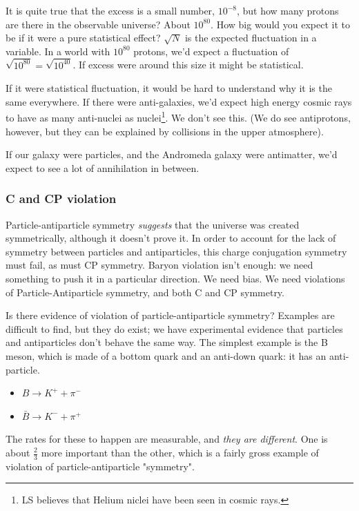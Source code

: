\documentclass[]{article}
\begin{document}
 It is quite true that the excess is a small number, $10^{-8}$, but how many protons are there in the observable universe? About $10^{80}$. How big would you expect it to be if it were a pure statistical effect? $\sqrt{N}$ is the expected fluctuation in a variable. In a world with $10^{80}$ protons, we'd expect a fluctuation of $\sqrt{10^{80}}=\sqrt{10^{40}}$. If excess were around this size it might be statistical.
 
 If it were statistical fluctuation, it would be hard to understand why it is the same everywhere. If there were anti-galaxies, we'd expect high energy cosmic rays to have as many anti-nuclei as nuclei\footnote{LS believes that Helium niclei have been seen in cosmic rays.}. We don't see this. (We do see antiprotons, however, but they can be explained by collisions in the upper atmosphere).
 
 If our galaxy were particles, and the Andromeda galaxy were antimatter, we'd expect to see a lot of annihilation in between.
 
 
\subsubsection{C and CP violation} \label{sec:sakharov2}

Particle-antiparticle symmetry \emph{suggests} that the universe was created symmetrically, although it doesn't prove it. In order to account for the lack of symmetry between particles and antiparticles, this charge conjugation symmetry must fail, as must CP symmetry.	 Baryon violation isn't enough: we need something to push it in a particular direction. We need bias. We need violations of Particle-Antiparticle symmetry, and both C and CP  symmetry.

Is there evidence of violation of particle-antiparticle symmetry? Examples are difficult to find, but they do exist; we have experimental evidence that particles and antiparticles don't behave the same way. The simplest example is the B meson, which is made of a bottom quark and an anti-down quark: it has an anti-particle. \begin{itemize}
	\item $B\rightarrow K^+ + \pi^-$ 
	\item $\bar{B}\rightarrow K^- + \pi^+$ 
\end{itemize}
 
 The rates for these to happen are measurable, and \emph{they are different}. One is about $\frac{2}{3}$ more important than the other, which is a fairly gross example of violation of particle-antiparticle "symmetry".
 
\end{document}
